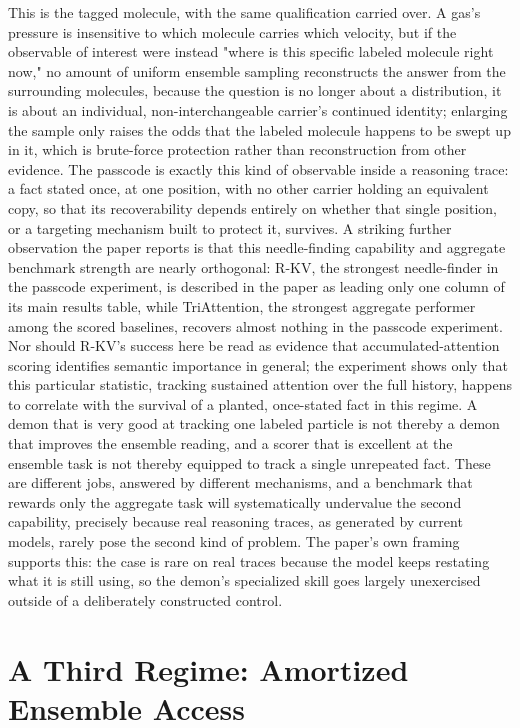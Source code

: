 \documentclass[11pt]{article}
\begin{document}
This is the tagged molecule, with the same qualification carried over. A gas's pressure is insensitive to which molecule carries which velocity, but if the observable of interest were instead "where is this specific labeled molecule right now," no amount of uniform ensemble sampling reconstructs the answer from the surrounding molecules, because the question is no longer about a distribution, it is about an individual, non-interchangeable carrier's continued identity; enlarging the sample only raises the odds that the labeled molecule happens to be swept up in it, which is brute-force protection rather than reconstruction from other evidence. The passcode is exactly this kind of observable inside a reasoning trace: a fact stated once, at one position, with no other carrier holding an equivalent copy, so that its recoverability depends entirely on whether that single position, or a targeting mechanism built to protect it, survives. A striking further observation the paper reports is that this needle-finding capability and aggregate benchmark strength are nearly orthogonal: R-KV, the strongest needle-finder in the passcode experiment, is described in the paper as leading only one column of its main results table, while TriAttention, the strongest aggregate performer among the scored baselines, recovers almost nothing in the passcode experiment. Nor should R-KV's success here be read as evidence that accumulated-attention scoring identifies semantic importance in general; the experiment shows only that this particular statistic, tracking sustained attention over the full history, happens to correlate with the survival of a planted, once-stated fact in this regime. A demon that is very good at tracking one labeled particle is not thereby a demon that improves the ensemble reading, and a scorer that is excellent at the ensemble task is not thereby equipped to track a single unrepeated fact. These are different jobs, answered by different mechanisms, and a benchmark that rewards only the aggregate task will systematically undervalue the second capability, precisely because real reasoning traces, as generated by current models, rarely pose the second kind of problem. The paper's own framing supports this: the case is rare on real traces because the model keeps restating what it is still using, so the demon's specialized skill goes largely unexercised outside of a deliberately constructed control.

\section{A Third Regime: Amortized Ensemble Access}
\end{document}
